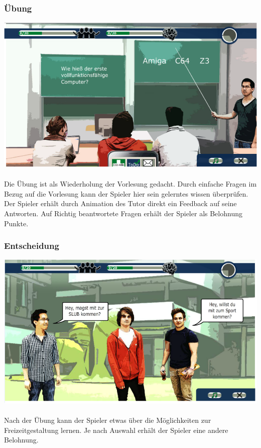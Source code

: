 \documentclass[a4paper, 11pt]{article} %
\begin{document}
\subsubsection{Übung}
\includegraphics[scale=0.535]{images/spiel/11.png}\\\\
Die Übung ist als Wiederholung der Vorlesung gedacht. Durch einfache Fragen im Bezug auf die Vorlesung kann der Spieler hier sein gelerntes wissen überprüfen. Der Spieler erhält durch Animation des Tutor direkt ein Feedback auf seine Antworten. Auf Richtig beantwortete Fragen erhält der Spieler als Belohnung Punkte.

\subsubsection{Entscheidung}
\includegraphics[scale=0.535]{images/spiel/12.png}\\\\
Nach der Übung kann der Spieler etwas über die Möglichkeiten zur Freizeitgestaltung lernen. Je nach Auswahl erhält der Spieler eine andere Belohnung.
\end{document}
